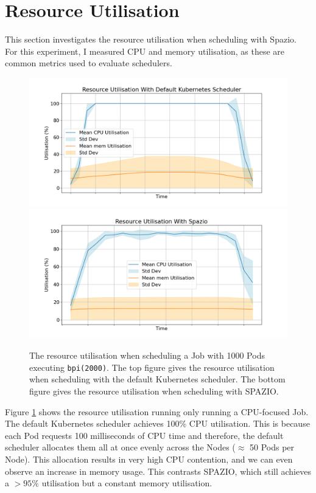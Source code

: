 \section{Resource Utilisation}
This section investigates the resource utilisation when scheduling with Spazio.
For this experiment, I measured CPU and memory utilisation, as these are common
metrics used to evaluate schedulers.


\begin{figure}[H]
    \centering
    \includegraphics[width=\textwidth]{images/pi-2000-1000x-pod-kube-util.png}\\
    \includegraphics[width=\textwidth]{images/pi-2000-1000x-pod-spazio-util.png}
    \caption{The resource utilisation when scheduling a Job with 1000 Pods
    executing \texttt{bpi(2000)}. The top figure gives the resource utilisation
    when scheduling with the default Kubernetes scheduler. The bottom figure
    gives the resource utilisation when scheduling with SPAZIO.}
    \label{fig:pi-2000-1000x-pod-util}
\end{figure}

Figure \ref{fig:pi-2000-1000x-pod-util} shows the resource utilisation running
only running a CPU-focused Job. The default Kubernetes scheduler achieves 100\%
CPU utilisation. This is because each Pod requests 100 milliseconds of CPU time
and therefore, the default scheduler allocates them all at once evenly across
the Nodes ($\approx$ 50 Pods per Node). This allocation results in very high CPU
contention, and we can even observe an increase in memory usage. This contrasts
SPAZIO, which still achieves a $> 95\%$ utilisation but a constant memory
utilisation.

